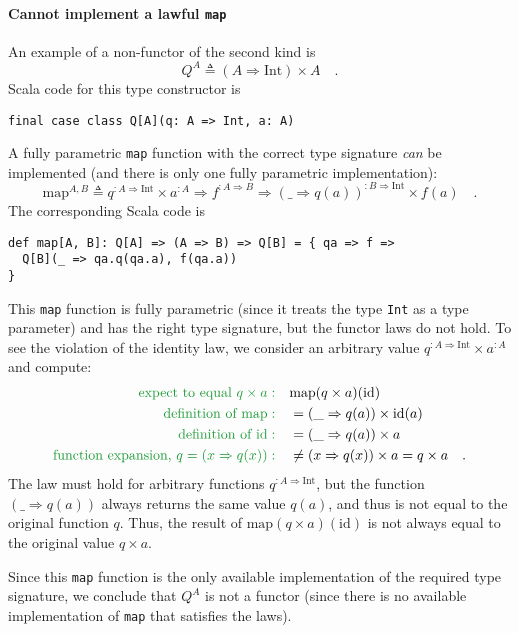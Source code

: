 \paragraph{Cannot implement a lawful \lstinline!map! }

An example of a non-functor of the second kind is 
\[
Q^{A}\triangleq\left(A\Rightarrow\text{Int}\right)\times A\quad.
\]
Scala code for this type constructor is
\begin{lstlisting}
final case class Q[A](q: A => Int, a: A)
\end{lstlisting}
A fully parametric \lstinline!map! function with the correct type
signature \emph{can} be implemented (and there is only one fully parametric
implementation):
\[
\text{map}^{A,B}\triangleq q^{:A\Rightarrow\text{Int}}\times a^{:A}\Rightarrow f^{:A\Rightarrow B}\Rightarrow(\_\Rightarrow q(a))^{:B\Rightarrow\text{Int}}\times f(a)\quad.
\]
The corresponding Scala code is
\begin{lstlisting}
def map[A, B]: Q[A] => (A => B) => Q[B] = { qa => f =>
  Q[B](_ => qa.q(qa.a), f(qa.a)) 
}
\end{lstlisting}
This \lstinline!map! function is fully parametric (since it treats
the type \lstinline!Int! as a type parameter) and has the right type
signature, but the functor laws do not hold. To see the violation
of the identity law, we consider an arbitrary value $q^{:A\Rightarrow\text{Int}}\times a^{:A}$
and compute:
\begin{align*}
{\color{greenunder}\text{expect to equal }q\times a:}\quad & \text{map}(q\times a)(\text{id})\\
{\color{greenunder}\text{definition of }\text{map}:}\quad & =(\_\Rightarrow q(a))\times\text{id}(a)\\
{\color{greenunder}\text{definition of }\text{id}:}\quad & =(\_\Rightarrow q(a))\times a\\
{\color{greenunder}\text{function expansion, }q=\left(x\Rightarrow q(x)\right):}\quad & \neq(x\Rightarrow q(x))\times a=q\times a\quad.
\end{align*}
The law must hold for arbitrary functions $q^{:A\Rightarrow\text{Int}}$,
but the function $\left(\_\Rightarrow q(a)\right)$ always returns
the same value $q(a)$, and thus is not equal to the original function
$q$. Thus, the result of $\text{map}(q\times a)(\text{id})$ is not
always equal to the original value $q\times a$. 

Since this \lstinline!map! function is the only available implementation
of the required type signature, we conclude that $Q^{A}$ is not a
functor (since there is no available implementation of \lstinline!map!
that satisfies the laws).

